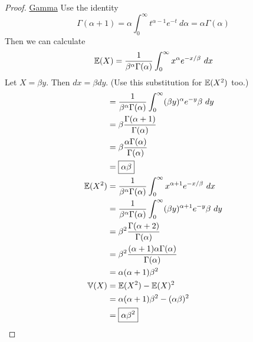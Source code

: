 \documentclass[a4paper]{article}
\begin{document}
\begin{proof}[Proof]
\underline{Gamma}
Use the identity
\[
	\Gamma(\alpha + 1) = \alpha \int^{\infty}_{0} t^{\alpha - 1}e^{-t} \ d \alpha = \alpha \Gamma(\alpha) 
\]
Then we can calculate
\[
	\mathbb{E}(X) = \frac{1}{\beta^{\alpha } \Gamma(\alpha)} \int^{\infty}_{0} x^{\alpha } e^{-x/\beta } \ dx
\]
Let \(X = \beta y\). Then \(dx = \beta dy\). (Use this substitution for \(\mathbb{E}(X^{2})\) too.)
\begin{align*}
	 & = \frac{1}{\beta^{\alpha } \Gamma(\alpha )} \int^{\infty}_{0} (\beta y)^{\alpha } e^{-y} \beta  \ dy  \\
	 & = \beta \frac{\Gamma(\alpha +1)}{\Gamma(\alpha)} \\
	 & = \beta \frac{\alpha \Gamma(\alpha )}{\Gamma(\alpha )} \\
	 & = \boxed{\alpha \beta } \\
	\mathbb{E}(X^{2}) & = \frac{1}{\beta^{\alpha } \Gamma(\alpha )} \int^{\infty}_{0} x^{\alpha + 1} e^{-x/\beta } \ dx \\
	 & = \frac{1}{\beta^{\alpha } \Gamma(\alpha )} \int^{\infty}_{0} (\beta y)^{\alpha + 1} e^{-y} \beta  \ dy \\
	 & = \beta^{2} \frac{\Gamma(\alpha + 2)}{\Gamma(\alpha )} \\
	 & = \beta^{2} \frac{(\alpha + 1) \alpha  \Gamma(\alpha)}{\Gamma(\alpha)} \\
	 & = \alpha (\alpha + 1) \beta^{2} \\
	\mathbb{V}(X) & = \mathbb{E}(X^{2}) - \mathbb{E}(X)^{2} \\
	 & = \alpha (\alpha + 1) \beta^{2} - (\alpha \beta )^{2} \\
	 & = \boxed{\alpha \beta^{2}}
\end{align*}


\end{proof}
\end{document}

